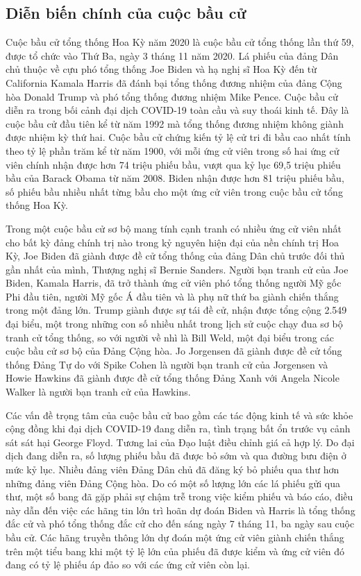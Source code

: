 \documentclass[14pt, a4paper]{article}
\numberwithin{equation}{section}
\numberwithin{figure}{section}
\numberwithin{dl}{section}
\numberwithin{md}{section}
\numberwithin{bd}{section}
\numberwithin{dn}{section}
\numberwithin{hq}{section}
\begin{document}
    \subsection{Diễn biến chính của cuộc bầu cử}

    Cuộc bầu cử tổng thống Hoa Kỳ năm 2020 là cuộc bầu cử tổng thống lần thứ 59, được tổ chức vào Thứ Ba, ngày 3 tháng 11 năm 2020. Lá phiếu của đảng Dân chủ thuộc về cựu phó tổng thống Joe Biden và hạ nghị sĩ Hoa Kỳ đến từ California Kamala Harris đã đánh bại tổng thống đương nhiệm của đảng Cộng hòa Donald Trump và phó tổng thống đương nhiệm Mike Pence. 
    Cuộc bầu cử diễn ra trong bối cảnh đại dịch COVID-19 toàn cầu và suy thoái kinh tế. 
    Đây là cuộc bầu cử đầu tiên kể từ năm 1992 mà tổng thống đương nhiệm không giành được nhiệm kỳ thứ hai. 
    Cuộc bầu cử chứng kiến tỷ lệ cử tri đi bầu cao nhất tính theo tỷ lệ phần trăm kể từ năm 1900, với mỗi ứng cử viên trong số hai ứng cử viên chính nhận được hơn 74 triệu phiếu bầu, vượt qua kỷ lục 69,5 triệu phiếu bầu của Barack Obama từ năm 2008. 
    Biden nhận được hơn 81 triệu phiếu bầu, số phiếu bầu nhiều nhất từng bầu cho một ứng cử viên trong cuộc bầu cử tổng thống Hoa Kỳ.

    Trong một cuộc bầu cử sơ bộ mang tính cạnh tranh có nhiều ứng cử viên nhất cho bất kỳ đảng chính trị nào trong kỷ nguyên hiện đại của nền chính trị Hoa Kỳ, Joe Biden đã giành được đề cử tổng thống của đảng Dân chủ trước đối thủ gần nhất của mình, Thượng nghị sĩ Bernie Sanders. 
    Người bạn tranh cử của Joe Biden, Kamala Harris, đã trở thành ứng cử viên phó tổng thống người Mỹ gốc Phi đầu tiên, người Mỹ gốc Á đầu tiên và là phụ nữ thứ ba giành chiến thắng trong một đảng lớn. 
    Trump giành được sự tái đề cử, nhận được tổng cộng 2.549 đại biểu, một trong những con số nhiều nhất trong lịch sử cuộc chạy đua sơ bộ tranh cử tổng thống, so với người về nhì là Bill Weld, một đại biểu trong các cuộc bầu cử sơ bộ của Đảng Cộng hòa. 
    Jo Jorgensen đã giành được đề cử tổng thống Đảng Tự do với Spike Cohen là người bạn tranh cử của Jorgensen và Howie Hawkins đã giành được đề cử tổng thống Đảng Xanh với Angela Nicole Walker là người bạn tranh cử của Hawkins.

    Các vấn đề trọng tâm của cuộc bầu cử bao gồm các tác động kinh tế và sức khỏe cộng đồng khi đại dịch COVID-19 đang diễn ra, tình trạng bất ổn trước vụ cảnh sát sát hại George Floyd.
    Tương lai của Đạo luật điều chỉnh giá cả hợp lý. Do đại dịch đang diễn ra, số lượng phiếu bầu đã được bỏ sớm và qua đường bưu điện ở mức kỷ lục. 
    Nhiều đảng viên Đảng Dân chủ đã đăng ký bỏ phiếu qua thư hơn những đảng viên Đảng Cộng hòa. 
    Do có một số lượng lớn các lá phiếu gửi qua thư, một số bang đã gặp phải sự chậm trễ trong việc kiểm phiếu và báo cáo,
    điều này dẫn đến việc các hãng tin lớn trì hoãn dự đoán Biden và Harris là tổng thống đắc cử và phó tổng thống đắc cử cho đến sáng ngày 7 tháng 11, ba ngày sau cuộc bầu cử. 
    Các hãng truyền thông lớn dự đoán một ứng cử viên giành chiến thắng trên một tiểu bang khi một tỷ lệ lớn của phiếu đã được kiểm và ứng cử viên đó đang có tỷ lệ phiếu áp đảo so với các ứng cử viên còn lại.
\end{document}
